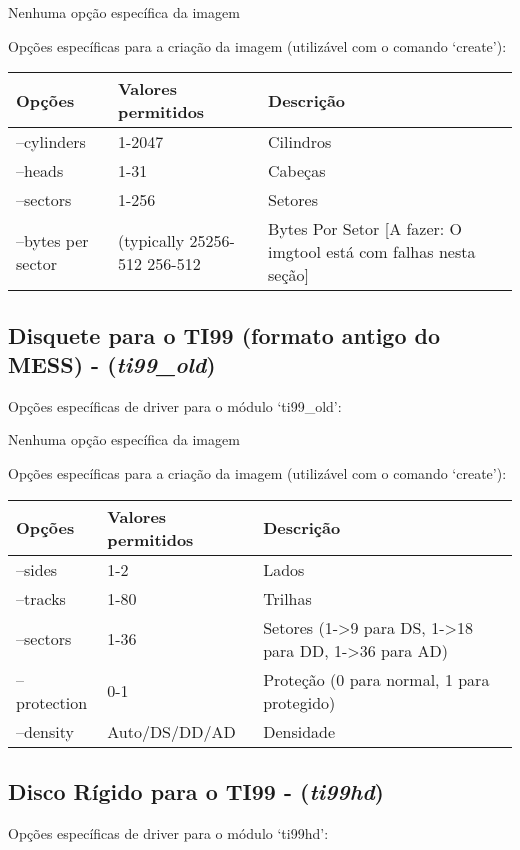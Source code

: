 \documentclass[letterpaper,10pt,brazil]{sphinxmanual}
\begin{document}
Nenhuma opção específica da imagem

Opções específicas para a criação da imagem (utilizável com o comando `create'):

\noindent\begin{tabulary}{\linewidth}{|L|L|L|}
\hline

Opções
&
Valores permitidos
&
Descrição
\\
\hline
--cylinders
&
1-2047
&
Cilindros
\\
\hline
--heads
&
1-31
&
Cabeças
\\
\hline
--sectors
&
1-256
&
Setores
\\
\hline
--bytes per sector
&
(typically 25256-512 256-512
&
Bytes Por Setor {[}A fazer: O imgtool está com falhas nesta seção{]}
\\
\hline\end{tabulary}



\subsection{Disquete para o TI99 (formato antigo do MESS) - (\emph{ti99\_old})}
\label{tools/imgtool:disquete-para-o-ti99-formato-antigo-do-mess-ti99-old}
Opções específicas de driver para o módulo `ti99\_old':

Nenhuma opção específica da imagem

Opções específicas para a criação da imagem (utilizável com o comando `create'):

\noindent\begin{tabulary}{\linewidth}{|L|L|L|}
\hline

Opções
&
Valores permitidos
&
Descrição
\\
\hline
--sides
&
1-2
&
Lados
\\
\hline
--tracks
&
1-80
&
Trilhas
\\
\hline
--sectors
&
1-36
&
Setores (1-\textgreater{}9 para DS, 1-\textgreater{}18 para DD, 1-\textgreater{}36 para AD)
\\
\hline
--protection
&
0-1
&
Proteção (0 para normal, 1 para protegido)
\\
\hline
--density
&
Auto/DS/DD/AD
&
Densidade
\\
\hline\end{tabulary}



\subsection{Disco Rígido para o TI99 - (\emph{ti99hd})}
\label{tools/imgtool:disco-rigido-para-o-ti99-ti99hd}
Opções específicas de driver para o módulo `ti99hd':
\end{document}
